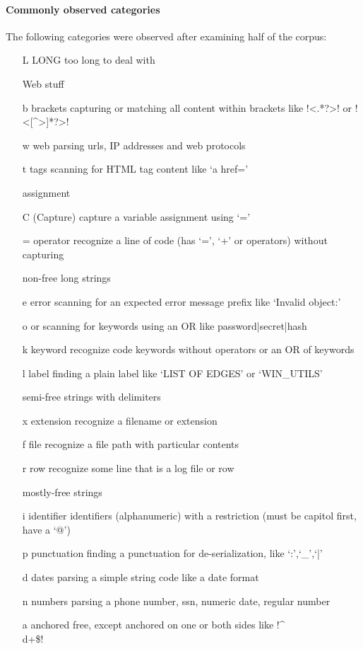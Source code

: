 \paragraph{Commonly observed categories} The following categories were observed after examining half of the corpus:
\begin{itemize}
\item[ L ] LONG     too long to deal with

Web stuff
\item[ b ] brackets  capturing or matching all content within brackets like \cverb!<.*?>! or \cverb!<[^>]*?>!
\item[ w ] web       parsing urls, IP addresses and web protocols
\item[ t ] tags      scanning for HTML tag content like `a href='

assignment
\item[ C ] (Capture) capture a variable assignment using `='
\item[ = ] operator  recognize a line of code (has `=', `+' or operators) without capturing

non-free long strings
\item[ e ] error     scanning for an expected error message prefix like `Invalid object:'
\item[ o ] or        scanning for keywords using an OR like password|secret|hash
\item[ k ] keyword   recognize code keywords without operators or an OR of keywords
\item[ l ] label     finding a plain label like `LIST OF EDGES' or `WIN_UTILS'

semi-free strings with delimiters
\item[ x ] extension  recognize a filename or extension
\item[ f ] file       recognize a file path with particular contents
\item[ r ] row        recognize some line that is a log file or row

mostly-free strings
\item[ i ] identifier    identifiers (alphanumeric) with a restriction (must be capitol first, have a `@')
\item[ p ] punctuation   finding a punctuation for de-serialization, like `:',`_',`|'
\item[ d ] dates         parsing a simple string code like a date format
\item[ n ] numbers       parsing a phone number, ssn, numeric date, regular number
\item[ a ] anchored         free, except anchored on one or both sides like \cverb!^\\d+\$!



\end{itemize}
